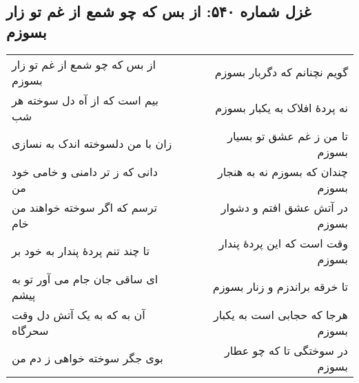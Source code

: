 \begin{center}
\section*{غزل شماره ۵۴۰: از بس که چو شمع از غم تو زار بسوزم}
\label{sec:540}
\begin{longtable}{l p{0.5cm} r}
از بس که چو شمع از غم تو زار بسوزم
&&
گویم نچنانم که دگربار بسوزم
\\
بیم است که از آه دل سوخته هر شب
&&
نه پردهٔ افلاک به یکبار بسوزم
\\
زان با من دلسوخته اندک به نسازی
&&
تا من ز غم عشق تو بسیار بسوزم
\\
دانی که ز تر دامنی و خامی خود من
&&
چندان که بسوزم نه به هنجار بسوزم
\\
ترسم که اگر سوخته خواهند من خام
&&
در آتش عشق افتم و دشوار بسوزم
\\
تا چند تنم پردهٔ پندار به خود بر
&&
وقت است که این پردهٔ پندار بسوزم
\\
ای ساقی جان جام می آور تو به پیشم
&&
تا خرقه براندزم و زنار بسوزم
\\
آن به که به یک آتش دل وقت سحرگاه
&&
هرجا که حجابی است به یکبار بسوزم
\\
بوی جگر سوخته خواهی ز دم من
&&
در سوختگی تا که چو عطار بسوزم
\\
\end{longtable}
\end{center}
